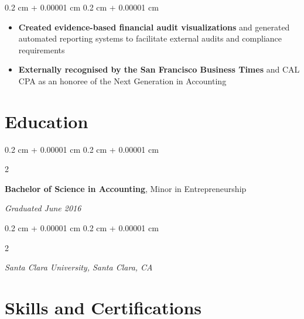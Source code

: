 \documentclass[10pt, letterpaper]{article}
\newenvironment{highlights}{
    \begin{itemize}[
        topsep=0.10 cm,
        parsep=0.10 cm,
        partopsep=0pt,
        itemsep=0pt,
        leftmargin=0.4 cm + 10pt
    ]
}{
    \end{itemize}
} %
\newenvironment{onecolentry}{
    \begin{adjustwidth}{
        0.2 cm + 0.00001 cm
    }{
        0.2 cm + 0.00001 cm
    }
}{
    \end{adjustwidth}
} %
\newenvironment{twocolentry}[2][]{
    \onecolentry
    \def\secondColumn{#2}
    \setcolumnwidth{\fill, 5.5 cm}
    \begin{paracol}{2}
}{
    \switchcolumn \raggedleft \secondColumn
    \end{paracol}
    \endonecolentry
} %
\begin{document}
\begin{onecolentry}
\begin{highlights}
                \item \textbf{Created evidence-based financial audit visualizations} and generated automated reporting systems to facilitate external audits and compliance requirements
                \item \textbf{Externally recognised by the San Francisco Business Times} and CAL CPA as an honoree of the Next Generation in Accounting
            \end{highlights}
        \end{onecolentry}




    
    \section{Education}
        \begin{twocolentry}{
            \textit{Graduated June 2016}
            
            }
            \textbf{Bachelor of Science in Accounting}, Minor in Entrepreneurship
        \end{twocolentry}
        \begin{twocolentry}{
            }
            
            \textit{Santa Clara University, Santa Clara, CA}

        \end{twocolentry}
        


    
    \section{Skills and Certifications}
\end{document}

